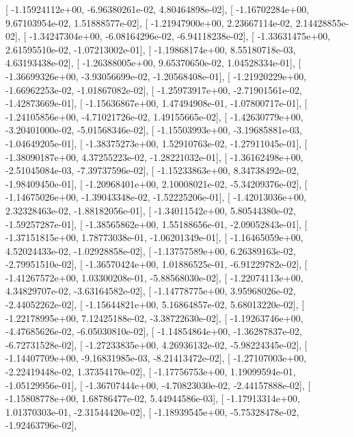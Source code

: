 \documentclass{article}
\begin{document}
       [ -1.15924112e+00,  -6.96380261e-02,   4.80464898e-02],
       [ -1.16702284e+00,   9.67103954e-02,   1.51888577e-02],
       [ -1.21947900e+00,   2.23667114e-02,   2.14428855e-02],
       [ -1.34247304e+00,  -6.08164296e-02,  -6.94118238e-02],
       [ -1.33631475e+00,   2.61595510e-02,  -1.07213002e-01],
       [ -1.19868174e+00,   8.55180718e-03,   4.63193438e-02],
       [ -1.26388005e+00,   9.65370650e-02,   1.04528334e-01],
       [ -1.36699326e+00,  -3.93056699e-02,  -1.20568408e-01],
       [ -1.21920229e+00,  -1.66962253e-02,  -1.01867082e-02],
       [ -1.25973917e+00,  -2.71901561e-02,  -1.42873669e-01],
       [ -1.15636867e+00,   1.47494908e-01,  -1.07800717e-01],
       [ -1.24105856e+00,  -4.71021726e-02,   1.49155665e-02],
       [ -1.42630779e+00,  -3.20401000e-02,  -5.01568346e-02],
       [ -1.15503993e+00,  -3.19685881e-03,  -1.04649205e-01],
       [ -1.38375273e+00,   1.52910763e-02,  -1.27911045e-01],
       [ -1.38090187e+00,   4.37255223e-02,  -1.28221032e-01],
       [ -1.36162498e+00,  -2.51045084e-03,  -7.39737596e-02],
       [ -1.15233863e+00,   8.34738492e-02,  -1.98409450e-01],
       [ -1.20968401e+00,   2.10008021e-02,  -5.34209376e-02],
       [ -1.14675026e+00,  -1.39043348e-02,  -1.52225206e-01],
       [ -1.42013036e+00,   2.32328463e-02,  -1.88182056e-01],
       [ -1.34011542e+00,   5.80544380e-02,  -1.59257287e-01],
       [ -1.38565862e+00,   1.55188656e-01,  -2.09052843e-01],
       [ -1.37151815e+00,   1.78773038e-01,  -1.06201349e-01],
       [ -1.16465059e+00,   4.52024433e-02,  -1.02928858e-02],
       [ -1.13757589e+00,   6.26389163e-02,  -2.79951510e-02],
       [ -1.36570424e+00,   1.01886525e-01,  -6.91229782e-02],
       [ -1.41267572e+00,   1.03300208e-01,  -5.88568030e-02],
       [ -1.22074113e+00,   4.34829707e-02,  -3.63164582e-02],
       [ -1.14778775e+00,   3.95968026e-02,  -2.44052262e-02],
       [ -1.15644821e+00,   5.16864857e-02,   5.68013220e-02],
       [ -1.22178995e+00,   7.12425188e-02,  -3.38722630e-02],
       [ -1.19263746e+00,  -4.47685626e-02,  -6.05030810e-02],
       [ -1.14854864e+00,  -1.36287837e-02,  -6.72731528e-02],
       [ -1.27233835e+00,   4.26936132e-02,  -5.98224345e-02],
       [ -1.14407709e+00,  -9.16831985e-03,  -8.21413472e-02],
       [ -1.27107003e+00,  -2.22419448e-02,   1.37354170e-02],
       [ -1.17756753e+00,   1.19099594e-01,  -1.05129956e-01],
       [ -1.36707444e+00,  -4.70823030e-02,  -2.44157888e-02],
       [ -1.15808778e+00,   1.68786477e-02,   5.44944586e-03],
       [ -1.17913314e+00,   1.01370303e-01,  -2.31544420e-02],
       [ -1.18939545e+00,  -5.75328478e-02,  -1.92463796e-02],
\end{document}
